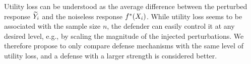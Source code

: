     Utility loss can be understood as the average difference between the perturbed response $\widetilde{Y}_i$ and the noiseless response $f^*(X_i)$. While utility loss seems to be associated with the sample size $n$, the defender can easily control it at any desired level, e.g., by scaling the magnitude of the injected perturbations. We therefore propose to only compare defense mechanisms with the same level of utility loss, and a defense with a larger strength is considered better.
    


    


    
    
    

    



